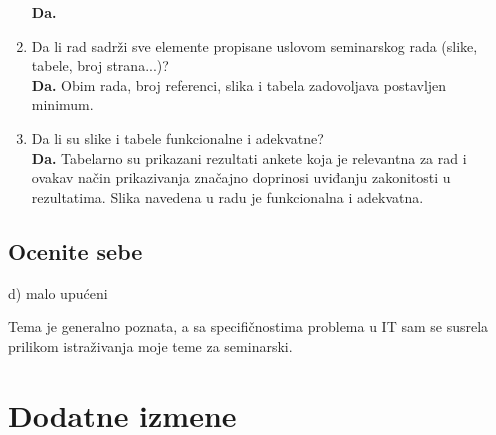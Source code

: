 \documentclass[a4paper]{report}
\begin{document}
\begin{enumerate}
\textbf{Da.}

\item Da li rad sadrži sve elemente propisane uslovom seminarskog rada (slike, tabele, broj strana...)?\\

\textbf{Da.} Obim rada, broj referenci, slika i tabela zadovoljava postavljen minimum. 

\item Da li su slike i tabele funkcionalne i adekvatne?\\

\textbf{Da.} Tabelarno su prikazani rezultati ankete koja je relevantna za rad i ovakav način prikazivanja značajno doprinosi uviđanju zakonitosti u rezultatima. Slika navedena u radu je funkcionalna i adekvatna.
\end{enumerate}

\section{Ocenite sebe}
d) malo upućeni

Tema je generalno poznata, a sa specifičnostima problema u IT sam se susrela prilikom istraživanja moje teme za seminarski.

\chapter{Dodatne izmene}
\end{document}

